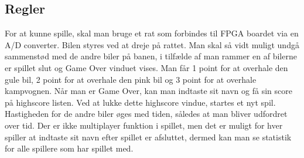 \subsection{Regler}

For at kunne spille, skal man bruge et rat som forbindes til FPGA boardet via en A/D converter. Bilen styres ved at dreje på rattet.
Man skal så vidt muligt undgå sammenstød med de andre biler på banen, i tilfælde af man rammer en af bilerne er spillet slut og Game Over vinduet vises. Man får 1 point for at overhale den gule bil, 2 point for at overhale den pink bil og 3 point for at overhale kampvognen. Når man er Game Over, kan man indtaste sit navn og få sin score på highscore listen. Ved at lukke dette highscore vindue, startes et nyt spil.
Hastigheden for de andre biler øges med tiden, således at man bliver udfordret over tid. 
Der er ikke multiplayer funktion i spillet, men det er muligt for hver spiller at indtaste sit navn efter spillet er afsluttet, dermed kan man se statistik for alle spillere som har spillet med.